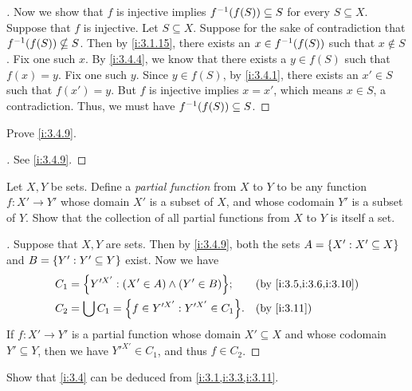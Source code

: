 \begin{proof}[]
  Now we show that \(f\) is injective implies \(f^{-1}\pa{f(S)} \subseteq S\) for every \(S \subseteq X\).
  Suppose that \(f\) is injective.
  Let \(S \subseteq X\).
  Suppose for the sake of contradiction that \(f^{-1}\pa{f(S)} \nsubseteq S\).
  Then by \cref{i:3.1.15}, there exists an \(x \in f^{-1}\pa{f(S)}\) such that \(x \notin S\).
  Fix one such \(x\).
  By \cref{i:3.4.4}, we know that there exists a \(y \in f(S)\) such that \(f(x) = y\).
  Fix one such \(y\).
  Since \(y \in f(S)\), by \cref{i:3.4.1}, there exists an \(x' \in S\) such that \(f(x') = y\).
  But \(f\) is injective implies \(x = x'\), which means \(x \in S\), a contradiction.
  Thus, we must have \(f^{-1}\pa{f(S)} \subseteq S\).
\end{proof}

\begin{ex}\label{i:ex:3.4.6}
  Prove \cref{i:3.4.9}.
\end{ex}

\begin{proof}[]
  See \cref{i:3.4.9}.
\end{proof}

\begin{ex}\label{i:ex:3.4.7}
  Let \(X, Y\) be sets.
  Define a \emph{partial function} from \(X\) to \(Y\) to be any function \(f : X' \to Y'\) whose domain \(X'\) is a subset of \(X\), and whose codomain \(Y'\) is a subset of \(Y\).
  Show that the collection of all partial functions from \(X\) to \(Y\) is itself a set.
\end{ex}

\begin{proof}[]
  Suppose that \(X, Y\) are sets.
  Then by \cref{i:3.4.9}, both the sets \(A = \left\lbrace X' : X' \subseteq X\right\rbrace\) and \(B = \left\lbrace Y' : Y' \subseteq Y\right\rbrace\) exist.
  Now we have
  \begin{align*}
    C_1 & = \set{Y'^{X'} : \pa{X' \in A} \land \pa{Y' \in B}};   &  & \by{i:3.5,i:3.6,i:3.10} \\
    C_2 & = \bigcup C_1 = \set{f \in Y'^{X'} : Y'^{X'} \in C_1}. &  & \by{i:3.11}             \\
  \end{align*}
  If \(f : X' \to Y'\) is a partial function whose domain \(X' \subseteq X\) and whose codomain \(Y' \subseteq Y\), then we have \(Y'^{X'} \in C_1\), and thus \(f \in C_2\).
\end{proof}

\begin{ex}\label{i:ex:3.4.8}
  Show that \cref{i:3.4} can be deduced from \cref{i:3.1,i:3.3,i:3.11}.
\end{ex}

